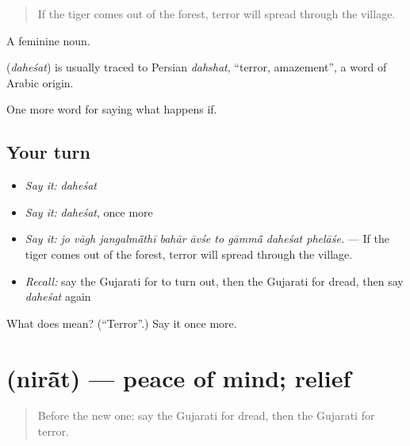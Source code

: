 \begin{quote}
If the tiger comes out of the forest, terror will spread through the village.
\end{quote}

A feminine noun.

\begin{cousinweb}
\textbf{} (\emph{daheśat}) is usually traced to Persian \emph{dahshat}, \textquotedblleft{}terror, amazement\textquotedblright{}, a word of Arabic origin.
\end{cousinweb}

\begin{grammarlens}[title={What you've built}]
One more word for saying what happens if.
\end{grammarlens}

\subsection*{Your turn}
\begin{itemize}
\raggedright
  \item \emph{Say it:} \emph{daheśat}
  \item \emph{Say it:} \emph{daheśat}, once more
  \item \emph{Say it:} \emph{jo vāgh jangalmā̃thī bahār āvśe to gāmmā̃ daheśat phelāśe.} — If the tiger comes out of the forest, terror will spread through the village.
  \item \emph{Recall:} say the Gujarati for to turn out, then the Gujarati for dread, then say \emph{daheśat} again
\end{itemize}

\begin{tcolorbox}[breakable,colback=teal!4,colframe=teal!35!black,title={Before you move on}]
What does  mean? (\textquotedblleft{}Terror\textquotedblright{}.) Say it once more.
\end{tcolorbox}
\section[\texorpdfstring{\gu{નિરાંત} (nirā̃t)}{નિરાંત (nirā̃t)}]{ (nirā̃t) — peace of mind; relief}

\label{lesson:GU-C369-nirat}



\begin{quote}
Before the new one: say the Gujarati for dread, then the Gujarati for terror.
\end{quote}

